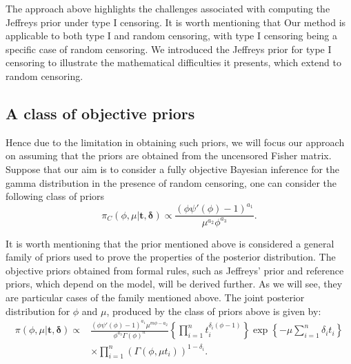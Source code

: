 \documentclass[]{interact}
\theoremstyle{plain}%
\theoremstyle{definition}
\theoremstyle{remark}
\begin{document}
 The approach above highlights the challenges associated with computing the Jeffreys prior under type I censoring. It is worth mentioning that Our method is applicable to both type I and random censoring, with type I censoring being a specific case of random censoring. We introduced the Jeffreys prior for type I censoring to illustrate the mathematical difficulties it presents, which extend to random censoring.

\subsection{A class of objective priors}

Hence due to the limitation in obtaining such priors, we will focus our approach on assuming that the priors are obtained from the uncensored Fisher matrix. Suppose that our aim is to consider a fully objective Bayesian inference for the gamma distribution in the presence of random censoring, one can consider the following class of priors
\begin{equation}\label{postunnk1} 
\pi_C(\phi,\mu|\boldsymbol{t,\delta})\propto\frac{(\phi\psi'(\phi)-1)^{a_1}}{\mu^{a_2}\phi^{a_3}}.
\end{equation}

It is worth mentioning that the prior mentioned above is considered a general family of priors used to prove the properties of the posterior distribution. The objective priors obtained from formal rules, such as Jeffreys' prior and reference priors, which depend on the model, will be derived further. As we will see, they are particular cases of the family mentioned above.
The joint posterior distribution for $\phi$ and $\mu$, produced by the class of priors above is given by:
\begin{align}\label{principal2}
\pi(\phi,\mu|\boldsymbol{t,\delta})\propto& \frac{(\phi\psi'(\phi)-1)^{a_1}\mu^{m\phi-a_2}}{\phi^{a_3}\Gamma(\phi)^n}\left\{\prod_{i=1}^n{t_i^{\delta_i(\phi-1)}}\right\}\exp\left\{-\mu\sum_{i=1}^n {\delta_i}t_i\right\}\nonumber\\ 
&\times\prod_{i=1}^n\left(\Gamma(\phi,\mu t_i)\right)^{1-\delta_i}.
\end{align}
\end{document}
